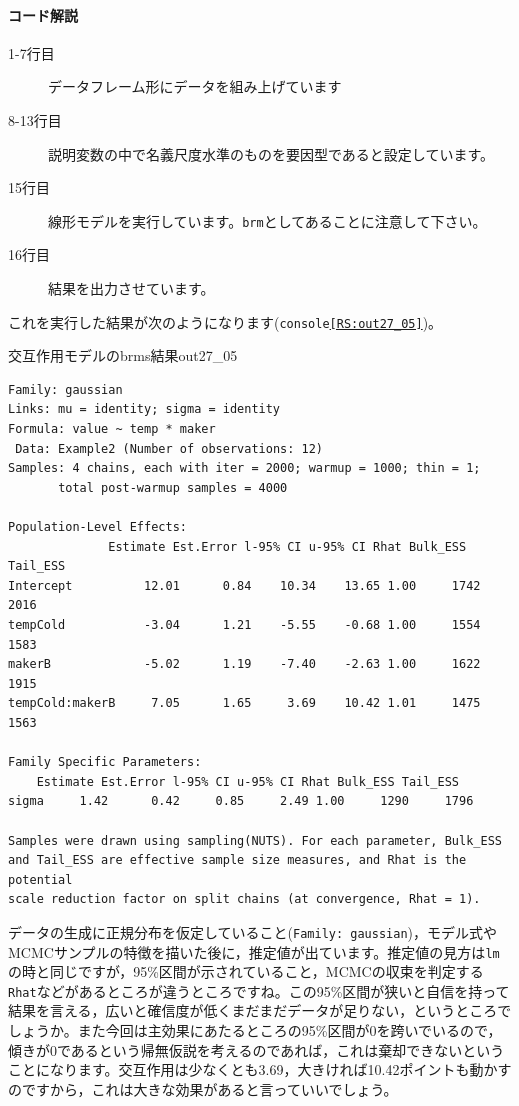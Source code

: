 \documentclass{ltjbook}
\begin{document}
\paragraph{コード解説}
\begin{description}
    \item[1-7行目] データフレーム形にデータを組み上げています
    \item[8-13行目] 説明変数の中で名義尺度水準のものを要因型であると設定しています。
    \item[15行目] 線形モデルを実行しています。\texttt{brm}としてあることに注意して下さい。
    \item[16行目] 結果を出力させています。
\end{description}
これを実行した結果が次のようになります(\texttt{console\ref{RS:out27_05}})。
\begin{Rscreen}{交互作用モデルのbrms結果}{out27_05}
\begin{verbatim}
Family: gaussian 
Links: mu = identity; sigma = identity 
Formula: value ~ temp * maker 
 Data: Example2 (Number of observations: 12) 
Samples: 4 chains, each with iter = 2000; warmup = 1000; thin = 1;
       total post-warmup samples = 4000

Population-Level Effects: 
              Estimate Est.Error l-95% CI u-95% CI Rhat Bulk_ESS Tail_ESS
Intercept          12.01      0.84    10.34    13.65 1.00     1742     2016
tempCold           -3.04      1.21    -5.55    -0.68 1.00     1554     1583
makerB             -5.02      1.19    -7.40    -2.63 1.00     1622     1915
tempCold:makerB     7.05      1.65     3.69    10.42 1.01     1475     1563

Family Specific Parameters: 
    Estimate Est.Error l-95% CI u-95% CI Rhat Bulk_ESS Tail_ESS
sigma     1.42      0.42     0.85     2.49 1.00     1290     1796

Samples were drawn using sampling(NUTS). For each parameter, Bulk_ESS
and Tail_ESS are effective sample size measures, and Rhat is the potential
scale reduction factor on split chains (at convergence, Rhat = 1).
\end{verbatim}
\end{Rscreen}
データの生成に正規分布を仮定していること(\texttt{Family: gaussian})，モデル式やMCMCサンプルの特徴を描いた後に，推定値が出ています。推定値の見方は\texttt{lm}の時と同じですが，95\%区間が示されていること，MCMCの収束を判定する\texttt{Rhat}などがあるところが違うところですね。この95\%区間が狭いと自信を持って結果を言える，広いと確信度が低くまだまだデータが足りない，というところでしょうか。また今回は主効果にあたるところの95\%区間が0を跨いでいるので，傾きが0であるという帰無仮説を考えるのであれば，これは棄却できないということになります。交互作用は少なくとも3.69，大きければ10.42ポイントも動かすのですから，これは大きな効果があると言っていいでしょう。
\end{document}

